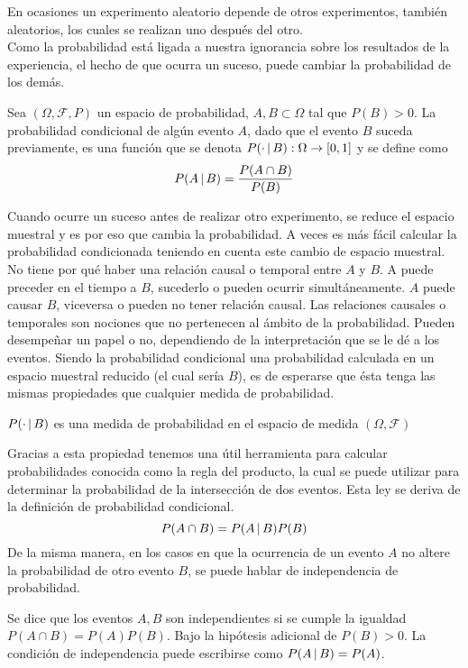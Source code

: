 En ocasiones un experimento aleatorio depende de otros experimentos, también aleatorios, los cuales se realizan uno después del otro.\\
Como la probabilidad está ligada a nuestra ignorancia sobre los resultados de la experiencia, el hecho de que ocurra un suceso, puede cambiar la probabilidad de los demás.
\begin{Def}
    Sea $(\Omega,\mathscr{F},P)$ un espacio de probabilidad, $A,B\subset\Omega$ tal que $P(B)>0$. La probabilidad condicional de algún evento $A$, dado que el evento $B$ suceda previamente, es una función que se denota $P(\cdot\thinspace|\thinspace B):\Omega\rightarrow [0,1]$ y se define como $$P(A\thinspace|\thinspace B)=\frac{P(A\cap B)}{P(B)}$$
\end{Def}
Cuando ocurre un suceso antes de realizar otro experimento, se reduce el espacio muestral y es por eso que cambia la probabilidad. A veces es más fácil calcular la probabilidad condicionada teniendo en cuenta este cambio de espacio muestral.
No tiene por qué haber una relación causal o temporal entre $A$ y $B$. A puede preceder en el tiempo a $B$, sucederlo o pueden ocurrir simultáneamente. $A$ puede causar $B$, viceversa o pueden no tener relación causal. Las relaciones causales o temporales son nociones que no pertenecen al ámbito de la probabilidad. Pueden desempeñar un papel o no, dependiendo de la interpretación que se le dé a los eventos.
Siendo la probabilidad condicional una probabilidad calculada en un espacio muestral reducido (el cual sería $B$), es de esperarse que ésta tenga las mismas propiedades que cualquier medida de probabilidad.
\begin{Prop}
    $P(\cdot\thinspace|\thinspace B)$ es una medida de probabilidad en el espacio de medida $(\Omega,\mathscr{F})$
\end{Prop}
Gracias a esta propiedad tenemos una útil herramienta para calcular probabilidades conocida como la regla del producto, la cual se puede utilizar para determinar la probabilidad de la intersección de dos eventos. Esta ley se deriva de la definición de probabilidad condicional.
$$P(A\cap B)=P(A\thinspace|\thinspace B)P(B)$$
De la misma manera, en los casos en que la ocurrencia de un evento $A$ no altere la probabilidad de otro evento $B$, se puede hablar de independencia de probabilidad.
\begin{Def}
    Se dice que los eventos $A, B$ son independientes si se cumple la igualdad $P(A\cap B)=P(A)P(B)$. Bajo la hipótesis adicional de $P(B)>0$. La condición de independencia puede escribirse como $P(A\thinspace|\thinspace B)=P(A)$.
\end{Def}
